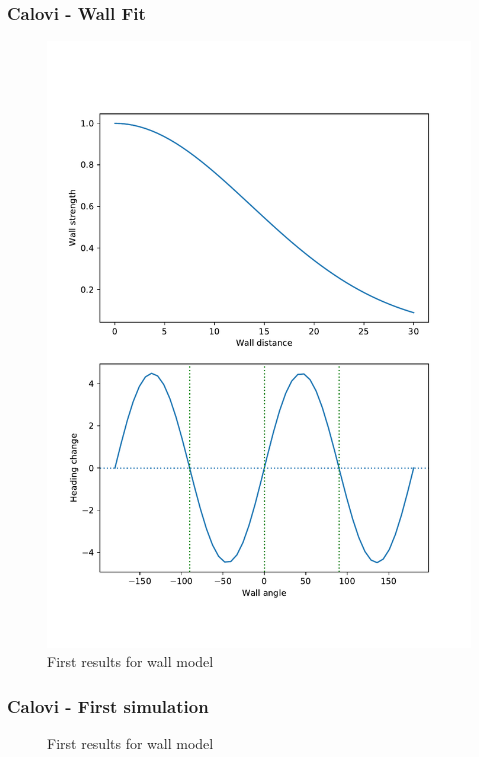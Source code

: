 \documentclass{beamer}
\begin{document}
\begin{frame}
  \frametitle{Calovi - Wall Fit}
  \begin{figure}[H]
    \centering
    \includegraphics[scale=0.25]{wall_fit.pdf}
    \caption{First results for wall model}
    \label{fig:calovi-sim}
  \end{figure}
\end{frame}

\begin{frame}
  \frametitle{Calovi - First simulation}
    \begin{figure}[H]
    \centering
    \caption{First results for wall model}
    \label{fig:calovi-sim}
  \end{figure}
\end{frame}
\end{document}

